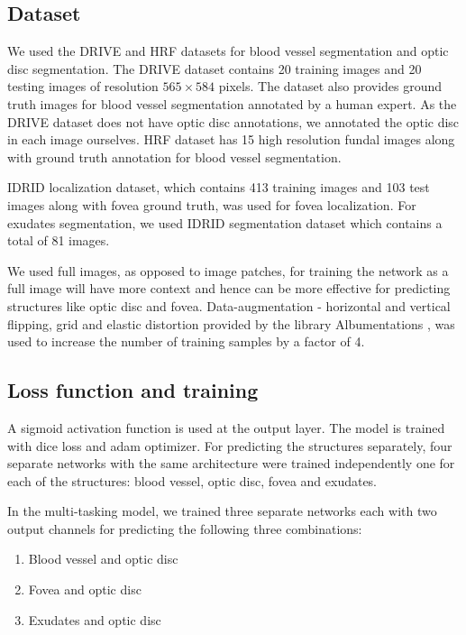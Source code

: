 \documentclass{article}
\begin{document}
\vspace{-0.2in}
\subsection{Dataset}
We used the DRIVE \cite{drive} and HRF \cite{budai2013robust}  datasets for blood vessel segmentation and optic disc segmentation. The DRIVE dataset contains 20 training images and 20 testing images of resolution $565 \times 584$ pixels. The dataset also provides ground truth images for blood vessel segmentation annotated by a human expert. As the DRIVE dataset does not have optic disc annotations, we annotated the optic disc in each image ourselves. HRF dataset has 15 high resolution fundal images along with ground truth annotation for blood vessel segmentation.

IDRID \cite{h25w98-18} localization dataset, which contains  413 training images and 103 test images along with fovea ground truth, was used for fovea localization.
For exudates segmentation, we used IDRID \cite{h25w98-18} segmentation dataset which contains a total of 81 images.

We used full images, as opposed to image patches, for training the network  as a full image will have more context and hence can be more effective for predicting structures like optic disc and fovea.
Data-augmentation - horizontal and vertical flipping, grid and elastic distortion provided by the library Albumentations \cite{buslaev2020albumentations},
was used  to increase the number of training samples by a factor of 4.

\subsection{Loss function and training}\label{sec:loss_and_training}
A sigmoid activation function is used at the output layer. The model is trained with dice loss and adam optimizer.
For predicting the structures separately, four separate networks with the same architecture were trained independently one for each of the structures: blood vessel, optic disc, fovea and exudates.

In the multi-tasking model, we trained three separate networks each with two output channels for predicting the following three combinations:
\begin{enumerate}
  \item Blood vessel and  optic disc
  \item Fovea and optic disc
  \item Exudates and optic disc
  \end{enumerate}
\end{document}
